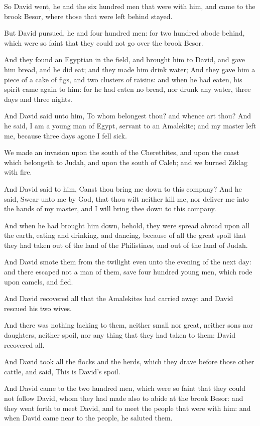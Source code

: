 \verse So David went, he and the six hundred men that were with him, and came to the brook Besor, where those that were left behind stayed.

\verse But David pursued, he and four hundred men: for two hundred abode behind, which were so faint that they could not go over the brook Besor.

\verse And they found an Egyptian in the field, and brought him to David, and gave him bread, and he did eat; and they made him drink water; \verse And they gave him a piece of a cake of figs, and two clusters of raisins: and when he had eaten, his spirit came again to him: for he had eaten no bread, nor drunk any water, three days and three nights.

\verse And David said unto him, To whom belongest thou? and whence art thou? And he said, I am a young man of Egypt, servant to an Amalekite; and my master left me, because three days agone I fell sick.

\verse We made an invasion upon the south of the Cherethites, and upon the coast which belongeth to Judah, and upon the south of Caleb; and we burned Ziklag with fire.

\verse And David said to him, Canst thou bring me down to this company?  And he said, Swear unto me by God, that thou wilt neither kill me, nor deliver me into the hands of my master, and I will bring thee down to this company.

\verse And when he had brought him down, behold, they were spread abroad upon all the earth, eating and drinking, and dancing, because of all the great spoil that they had taken out of the land of the Philistines, and out of the land of Judah.

\verse And David smote them from the twilight even unto the evening of the next day: and there escaped not a man of them, save four hundred young men, which rode upon camels, and fled.

\verse And David recovered all that the Amalekites had carried away: and David rescued his two wives.

\verse And there was nothing lacking to them, neither small nor great, neither sons nor daughters, neither spoil, nor any thing that they had taken to them: David recovered all.

\verse And David took all the flocks and the herds, which they drave before those other cattle, and said, This is David's spoil.

\verse And David came to the two hundred men, which were so faint that they could not follow David, whom they had made also to abide at the brook Besor: and they went forth to meet David, and to meet the people that were with him: and when David came near to the people, he saluted them.

